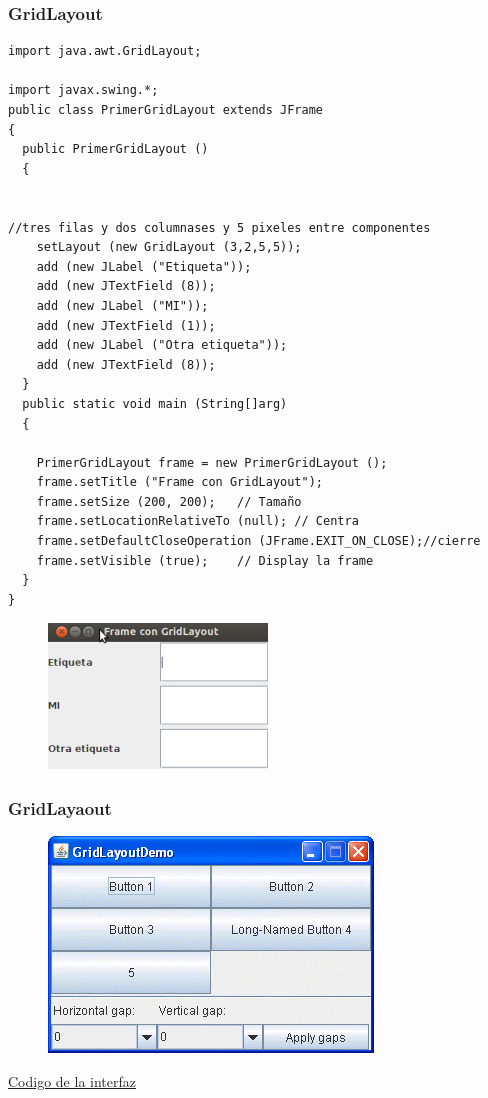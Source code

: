 \documentclass{beamer}
\begin{document}
\begin{frame}[fragile]
\frametitle{GridLayout}
\begin{multicols}{2}
\begin{tiny}
\begin{verbatim}
import java.awt.GridLayout;

import javax.swing.*;
public class PrimerGridLayout extends JFrame
{
  public PrimerGridLayout ()
  {


//tres filas y dos columnases y 5 pixeles entre componentes
    setLayout (new GridLayout (3,2,5,5));
    add (new JLabel ("Etiqueta"));
    add (new JTextField (8));
    add (new JLabel ("MI"));
    add (new JTextField (1));
    add (new JLabel ("Otra etiqueta"));
    add (new JTextField (8));
  }
  public static void main (String[]arg)
  {

    PrimerGridLayout frame = new PrimerGridLayout ();
    frame.setTitle ("Frame con GridLayout");
    frame.setSize (200, 200);   // Tamaño
    frame.setLocationRelativeTo (null); // Centra
    frame.setDefaultCloseOperation (JFrame.EXIT_ON_CLOSE);//cierre
    frame.setVisible (true);    // Display la frame
  }
}
\end{verbatim}
\end{tiny}

\begin{figure}
\includegraphics[scale=0.64]{imagenes/gridlayout.png}
\end{figure}
\end{multicols}
\end{frame}

\begin{frame}[fragile]
    \frametitle{GridLayaout}
  \begin{figure}
\includegraphics[scale=0.7]{imagenes/gridl.png}
\end{figure}  
\begin{center}{\color{blue}
\href{https://docs.oracle.com/javase/tutorial/displayCode.html?code=https://docs.oracle.com/javase/tutorial/uiswing/examples/layout/GridLayoutDemoProject/src/layout/GridLayoutDemo.java}{Codigo de la interfaz}}
\end{center}
\end{frame}
\end{document}
